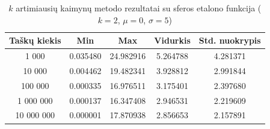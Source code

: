 \begin{table}[H]
    \centering
    \begin{tabular}{|c|c|c|c|c|}
        \hline
        \textbf{Taškų kiekis} & \textbf{Min} & \textbf{Max} & \textbf{Vidurkis} & \textbf{Std. nuokrypis} \\ \hline
        1 000        & 0.035480 & 24.982916 & 5.264788 & 4.281371 \\ \hline
        10 000       & 0.004462 & 19.482341 & 3.928812 & 2.991844 \\ \hline
        100 000      & 0.000335 & 16.976511 & 3.175401 & 2.397680 \\ \hline
        1 000 000    & 0.000137 & 16.347408 & 2.946531 & 2.219609 \\ \hline
        10 000 000   & 0.000001 & 17.870938 & 2.856653 & 2.157891 \\ \hline
    \end{tabular}
    \caption{$k$ artimiausių kaimynų metodo rezultatai su sferos etalono funkcija ($k = 2$, $\mu = 0$, $\sigma = 5$)}
\end{table}
